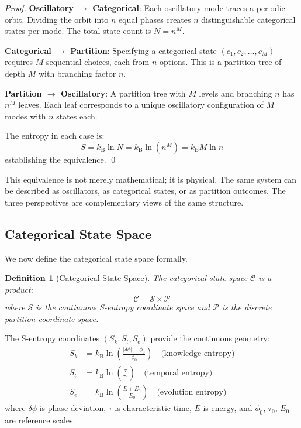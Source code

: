 \documentclass[twocolumn,10pt,aps,prd,superscriptaddress,nofootinbib]{revtex4-2}
\newtheorem{definition}[theorem]{Definition}
\theoremstyle{remark}
\newcommand{\kB}{k_{\mathrm{B}}}
\newcommand{\Cspace}{\mathcal{C}}
\newcommand{\Pspace}{\mathcal{P}}
\begin{document}
\begin{proof}
\textbf{Oscillatory $\to$ Categorical}: Each oscillatory mode traces a periodic orbit. Dividing the orbit into $n$ equal phases creates $n$ distinguishable categorical states per mode. The total state count is $N = n^M$.

\textbf{Categorical $\to$ Partition}: Specifying a categorical state $(c_1, c_2, \ldots, c_M)$ requires $M$ sequential choices, each from $n$ options. This is a partition tree of depth $M$ with branching factor $n$.

\textbf{Partition $\to$ Oscillatory}: A partition tree with $M$ levels and branching $n$ has $n^M$ leaves. Each leaf corresponds to a unique oscillatory configuration of $M$ modes with $n$ states each.

The entropy in each case is:
\begin{equation}
S = \kB \ln N = \kB \ln(n^M) = \kB M \ln n
\end{equation}
establishing the equivalence. \qed
\end{proof}

This equivalence is not merely mathematical; it is physical. The same system can be described as oscillators, as categorical states, or as partition outcomes. The three perspectives are complementary views of the same structure.

\subsection{Categorical State Space}

We now define the categorical state space formally.

\begin{definition}[Categorical State Space]
\label{def:categorical_space}
The categorical state space $\Cspace$ is a product:
\begin{equation}
\Cspace = \mathcal{S} \times \Pspace
\label{eq:categorical_space}
\end{equation}
where $\mathcal{S}$ is the continuous S-entropy coordinate space and $\Pspace$ is the discrete partition coordinate space.
\end{definition}

The S-entropy coordinates $(S_k, S_t, S_e)$ provide the continuous geometry:
\begin{align}
S_k &= \kB \ln\left(\frac{|\delta\phi| + \phi_0}{\phi_0}\right) \quad \text{(knowledge entropy)} \label{eq:S_k} \\
S_t &= \kB \ln\left(\frac{\tau}{\tau_0}\right) \quad \text{(temporal entropy)} \label{eq:S_t} \\
S_e &= \kB \ln\left(\frac{E + E_0}{E_0}\right) \quad \text{(evolution entropy)} \label{eq:S_e}
\end{align}
where $\delta\phi$ is phase deviation, $\tau$ is characteristic time, $E$ is energy, and $\phi_0$, $\tau_0$, $E_0$ are reference scales.
\end{document}
